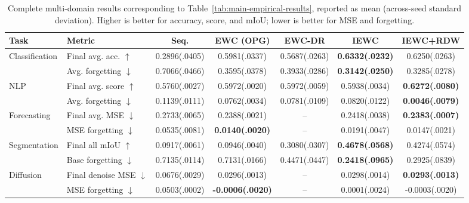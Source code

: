 \begin{table}[H]
\caption{Complete multi-domain results corresponding to Table~\ref{tab:main-empirical-results}, reported as mean (across-seed standard deviation). Higher is better for accuracy, score, and mIoU; lower is better for MSE and forgetting.}
\label{tab:main-empirical-results-uncertainty}
\centering
\small
\setlength{\tabcolsep}{2.5pt}
\renewcommand{\arraystretch}{0.96}
\begin{tabular}{@{}llccccc@{}}
\toprule
Task & Metric & Seq. & EWC (OPG) & EWC-DR & IEWC & IEWC+RDW \\
\midrule
Classification & Final avg. acc. $\uparrow$ & 0.2896(.0405) & 0.5981(.0337) & 0.5687(.0263) & \textbf{0.6332(.0232)} & 0.6250(.0263) \\
& Avg. forgetting $\downarrow$ & 0.7066(.0466) & 0.3595(.0378) & 0.3933(.0286) & \textbf{0.3142(.0250)} & 0.3285(.0278) \\
\addlinespace[1pt]
NLP & Final avg. score $\uparrow$ & 0.5760(.0027) & 0.5972(.0020) & 0.5972(.0059) & 0.5938(.0034) & \textbf{0.6272(.0080)} \\
& Avg. forgetting $\downarrow$ & 0.1139(.0111) & 0.0762(.0034) & 0.0781(.0109) & 0.0820(.0122) & \textbf{0.0046(.0079)} \\
\addlinespace[1pt]
Forecasting & Final avg. MSE $\downarrow$ & 0.2733(.0065) & 0.2388(.0021) & -- & 0.2418(.0038) & \textbf{0.2383(.0007)} \\
& MSE forgetting $\downarrow$ & 0.0535(.0081) & \textbf{0.0140(.0020)} & -- & 0.0191(.0047) & 0.0147(.0021) \\
\addlinespace[1pt]
Segmentation & Final all mIoU $\uparrow$ & 0.0917(.0061) & 0.0946(.0040) & 0.3080(.0307) & \textbf{0.4678(.0568)} & 0.4274(.0574) \\
& Base forgetting $\downarrow$ & 0.7135(.0114) & 0.7131(.0166) & 0.4471(.0447) & \textbf{0.2418(.0965)} & 0.2925(.0839) \\
\addlinespace[1pt]
Diffusion & Final denoise MSE $\downarrow$ & 0.0676(.0029) & 0.0296(.0013) & -- & 0.0298(.0014) & \textbf{0.0293(.0013)} \\
& MSE forgetting $\downarrow$ & 0.0503(.0002) & \textbf{-0.0006(.0020)} & -- & 0.0001(.0024) & -0.0003(.0020) \\
\bottomrule
\end{tabular}
\end{table}

